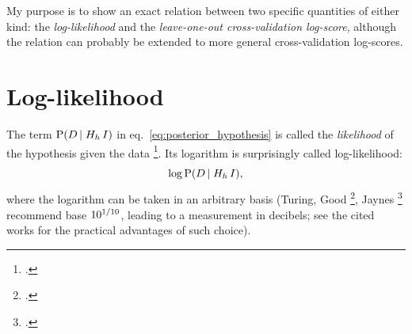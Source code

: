 \documentclass[\ifafour a4paper,12pt,\else a5paper,10pt,\fi%
onecolumn,oneside,article,%
british%
]{memoir}
\theoremstyle{remark}
\theoremstyle{innote}
\newcommand*{\citep}{\footcites}
\newcommand*{\p}{\mathrm{P}}%
\renewcommand*{\|}[1][]{\nonscript\,#1\vert\nonscript\;\mathopen{}}
\newcommand*{\sect}{\S}%
\newcommand*{\chap}{ch.}%
\newcommand*{\eqn}{eq.}%
\newcommand*{\eg}{{e.g.}}
\newcommand*{\yK}{I}
\begin{document}
My purpose is to show an exact relation between two specific quantities of
either kind: the \emph{log-likelihood} and the \emph{leave-one-out cross-validation
log-score}, although the relation can probably be extended to more general
cross-validation log-scores. 



\section{Log-likelihood}
\label{sec:loglh}

The term $\p(D \| H_{h} \, \yK)$ in \eqn~\eqref{eq:posterior_hypothesis} is
called the \emph{likelihood} of the hypothesis given the data
\citep[\sect~6.1 p.~62]{good1950}. Its logarithm is surprisingly called log-likelihood:
\begin{equation}
  \label{eq:log-likelihood}
  \log\p(D \| H_{h} \, \yK),
\end{equation}
where the logarithm can be taken in an arbitrary basis (Turing, Good
\citep[\eg][]{good1985,good1950,good1969}, Jaynes
\citep[\sect~4.2]{jaynes1994_r2003} recommend base
$\cramped10^{1/10}$, leading to a measurement in decibels; see the
cited works for the practical advantages of such choice).
\end{document}
